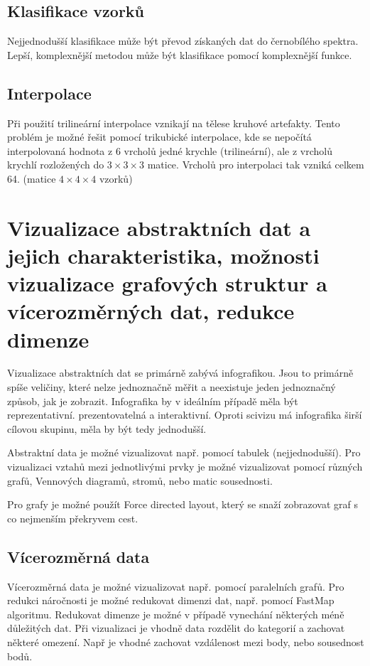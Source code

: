 \documentclass[10pt,a4paper, table]{article}
\begin{document}
\subsection{Klasifikace vzorků}
Nejjednodušší klasifikace může být převod získaných dat do černobílého spektra. Lepší, komplexnější metodou může být klasifikace pomocí komplexnější funkce.
\subsection{Interpolace}
Při použití trilineární interpolace vznikají na tělese kruhové artefakty. Tento problém je možné řešit pomocí trikubické interpolace, kde se nepočítá interpolovaná hodnota z 6 vrcholů jedné krychle (trilineární), ale z vrcholů krychlí rozložených do $3\times3\times3$ matice. Vrcholů pro interpolaci tak vzniká celkem 64. (matice $4\times4\times4$ vzorků)

\clearpage
\section{Vizualizace  abstraktních dat a  jejich  charakteristika, možnosti vizualizace grafových struktur a vícerozměrných dat, redukce dimenze}
Vizualizace abstraktních dat se primárně zabývá infografikou. Jsou to primárně spíše veličiny, které nelze jednoznačně měřit a neexistuje jeden jednoznačný způsob, jak je zobrazit. Infografika by v ideálním případě měla být reprezentativní. prezentovatelná a interaktivní. Oproti scivizu má infografika širší cílovou skupinu, měla by být tedy jednodušší. \par
Abstraktní data je možné vizualizovat např. pomocí tabulek (nejjednodušší). Pro vizualizaci vztahů mezi jednotlivými prvky je možné vizualizovat pomocí různých grafů, Vennových diagramů, stromů, nebo matic sousednosti.\par
Pro grafy je možné použít Force directed layout, který se snaží zobrazovat graf s co nejmenším překryvem cest.
\subsection{Vícerozměrná data}
Vícerozměrná data je možné vizualizovat např. pomocí paralelních grafů. Pro redukci náročnosti je možné redukovat dimenzi dat, např. pomocí FastMap algoritmu. Redukovat dimenze je možné v případě vynechání některých méně důležitých dat. Při vizualizaci je vhodně data rozdělit do kategorií a zachovat některé omezení. Např je vhodné zachovat vzdálenost mezi body, nebo sousednost bodů.
\end{document}
